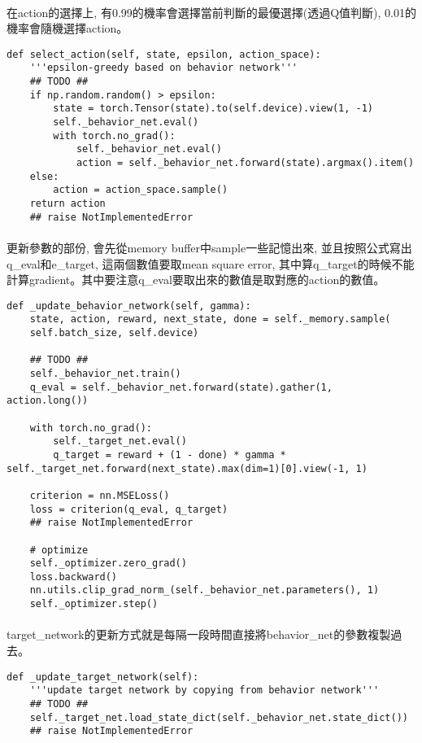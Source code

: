 \paragraph{}
在action的選擇上, 有0.99的機率會選擇當前判斷的最優選擇(透過Q值判斷), 0.01的機率會隨機選擇action。
\begin{lstlisting}
def select_action(self, state, epsilon, action_space):
    '''epsilon-greedy based on behavior network'''
    ## TODO ##
    if np.random.random() > epsilon:
        state = torch.Tensor(state).to(self.device).view(1, -1)
        self._behavior_net.eval()
        with torch.no_grad():
            self._behavior_net.eval()
            action = self._behavior_net.forward(state).argmax().item()
    else:
        action = action_space.sample()
    return action
    ## raise NotImplementedError
\end{lstlisting}
\paragraph{}
更新參數的部份, 會先從memory buffer中sample一些記憶出來, 並且按照公式寫出q\_eval和e\_target, 這兩個數值要取mean square error, 其中算q\_target的時候不能計算gradient。其中要注意q\_eval要取出來的數值是取對應的action的數值。
\begin{lstlisting}
def _update_behavior_network(self, gamma):
    state, action, reward, next_state, done = self._memory.sample(
    self.batch_size, self.device)

    ## TODO ##
    self._behavior_net.train()
    q_eval = self._behavior_net.forward(state).gather(1, action.long())

    with torch.no_grad():
        self._target_net.eval()
        q_target = reward + (1 - done) * gamma * self._target_net.forward(next_state).max(dim=1)[0].view(-1, 1)

    criterion = nn.MSELoss()
    loss = criterion(q_eval, q_target)
    ## raise NotImplementedError

    # optimize
    self._optimizer.zero_grad()
    loss.backward()
    nn.utils.clip_grad_norm_(self._behavior_net.parameters(), 1)
    self._optimizer.step()
\end{lstlisting}
\paragraph{}
target\_network的更新方式就是每隔一段時間直接將behavior\_net的參數複製過去。
\begin{lstlisting}
def _update_target_network(self):
    '''update target network by copying from behavior network'''
    ## TODO ##
    self._target_net.load_state_dict(self._behavior_net.state_dict())
    ## raise NotImplementedError
\end{lstlisting}
